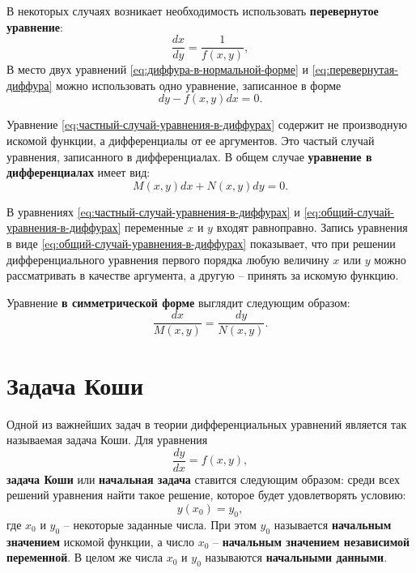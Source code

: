 \documentclass[a5paper, 11pt]{extbook}
\theoremstyle{definition}
\theoremstyle{definition}
\theoremstyle{definition}
\begin{document}
В некоторых случаях возникает необходимость использовать \textbf{перевернутое уравнение}:
\begin{equation}
    \label{eq:перевернутая-диффура}
    \frac{dx}{dy} = \frac{1}{f(x, y)},
\end{equation}
В место двух уравнений \eqref{eq:диффура-в-нормальной-форме} и \eqref{eq:перевернутая-диффура} можно использовать одно уравнение, записанное в форме
\begin{equation}
    \label{eq:частный-случай-уравнения-в-диффурах}
    dy - f(x, y)dx = 0.
\end{equation}

Уравнение \eqref{eq:частный-случай-уравнения-в-диффурах} содержит не производную искомой функции, а дифференциалы от ее аргументов. Это частый случай уравнения, записанного в дифференциалах. В общем случае \textbf{уравнение в дифференциалах} имеет вид:
\begin{equation}
    \label{eq:общий-случай-уравнения-в-диффурах}
    M(x, y) dx + N(x, y) dy = 0.
\end{equation}

В уравнениях \eqref{eq:частный-случай-уравнения-в-диффурах} и \eqref{eq:общий-случай-уравнения-в-диффурах} переменные \(x\) и \(y\) входят равноправно. Запись уравнения в виде \eqref{eq:общий-случай-уравнения-в-диффурах} показывает, что при решении дифференциального уравнения первого порядка любую величину \(x\) или \(y\) можно рассматривать в качестве аргумента, а другую -- принять за искомую функцию.

Уравнение \textbf{в симметрической форме} выглядит следующим образом:
\begin{equation}
    \frac{dx}{M(x, y)} = \frac{dy}{N(x, y)}.
\end{equation}

\section{Задача Коши}

Одной из важнейших задач в теории дифференциальных уравнений является так называемая задача Коши. Для уравнения
\begin{equation}
    \label{eq:уравнение-коши}
    \frac{dy}{dx} = f(x, y),
\end{equation}
\textbf{задача Коши} или \textbf{начальная задача} ставится следующим образом: среди всех решений уравнения найти такое решение, которое будет удовлетворять условию:
\begin{equation}
    y(x_0) = y_0,
\end{equation}
где \(x_0\) и \(y_0\) -- некоторые заданные числа. При этом \(y_0\) называется \textbf{начальным значением} искомой функции, а число \(x_0\) -- \textbf{начальным значением независимой переменной}. В целом же числа \(x_0\) и \(y_0\) называются \textbf{начальными данными}.
\end{document}
